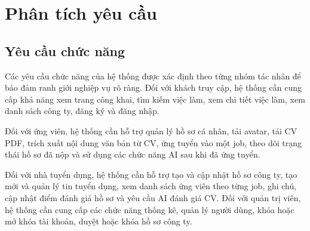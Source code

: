 \documentclass[../DoAn.tex]{subfiles}
\begin{document}
\section{Phân tích yêu cầu}
\label{sec:phan-tich-yeu-cau}

\subsection{Yêu cầu chức năng}

Các yêu cầu chức năng của hệ thống được xác định theo từng nhóm tác nhân để bảo đảm ranh giới nghiệp vụ rõ ràng. Đối với khách truy cập, hệ thống cần cung cấp khả năng xem trang công khai, tìm kiếm việc làm, xem chi tiết việc làm, xem danh sách công ty, đăng ký và đăng nhập.

Đối với ứng viên, hệ thống cần hỗ trợ quản lý hồ sơ cá nhân, tải avatar, tải CV PDF, trích xuất nội dung văn bản từ CV, ứng tuyển vào một job, theo dõi trạng thái hồ sơ đã nộp và sử dụng các chức năng AI sau khi đã ứng tuyển.

Đối với nhà tuyển dụng, hệ thống cần hỗ trợ tạo và cập nhật hồ sơ công ty, tạo mới và quản lý tin tuyển dụng, xem danh sách ứng viên theo từng job, ghi chú, cập nhật điểm đánh giá hồ sơ và yêu cầu AI đánh giá CV. Đối với quản trị viên, hệ thống cần cung cấp các chức năng thống kê, quản lý người dùng, khóa hoặc mở khóa tài khoản, duyệt hoặc khóa hồ sơ công ty.
\end{document}
